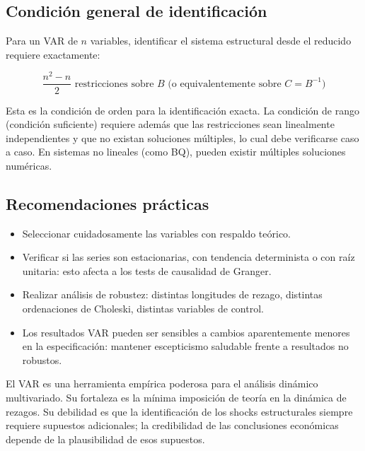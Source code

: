 \documentclass[12pt]{article}
\begin{document}
\subsection{Condici\'on general de identificaci\'on}

Para un VAR de $n$ variables, identificar el sistema estructural desde el reducido requiere exactamente:

\begin{equation}
\frac{n^2 - n}{2} \text{ restricciones sobre } B \text{ (o equivalentemente sobre } C = B^{-1})
\end{equation}

\begin{intuicionmat}
Esta es la condici\'on de orden para la identificaci\'on exacta. La condici\'on de rango (condici\'on suficiente) requiere adem\'as que las restricciones sean linealmente independientes y que no existan soluciones m\'ultiples, lo cual debe verificarse caso a caso. En sistemas no lineales (como BQ), pueden existir m\'ultiples soluciones num\'ericas.
\end{intuicionmat}

\subsection{Recomendaciones pr\'acticas}

\begin{itemize}
  \item Seleccionar cuidadosamente las variables con respaldo te\'orico.
  \item Verificar si las series son estacionarias, con tendencia determinista o con ra\'iz unitaria: esto afecta a los tests de causalidad de Granger.
  \item Realizar an\'alisis de robustez: distintas longitudes de rezago, distintas ordenaciones de Choleski, distintas variables de control.
  \item Los resultados VAR pueden ser sensibles a cambios aparentemente menores en la especificaci\'on: mantener escepticismo saludable frente a resultados no robustos.
\end{itemize}

\begin{intuicion}
El VAR es una herramienta emp\'irica poderosa para el an\'alisis din\'amico multivariado. Su fortaleza es la m\'inima imposici\'on de teor\'ia en la din\'amica de rezagos. Su debilidad es que la identificaci\'on de los shocks estructurales siempre requiere supuestos adicionales; la credibilidad de las conclusiones econ\'omicas depende de la plausibilidad de esos supuestos.
\end{intuicion}
\end{document}
